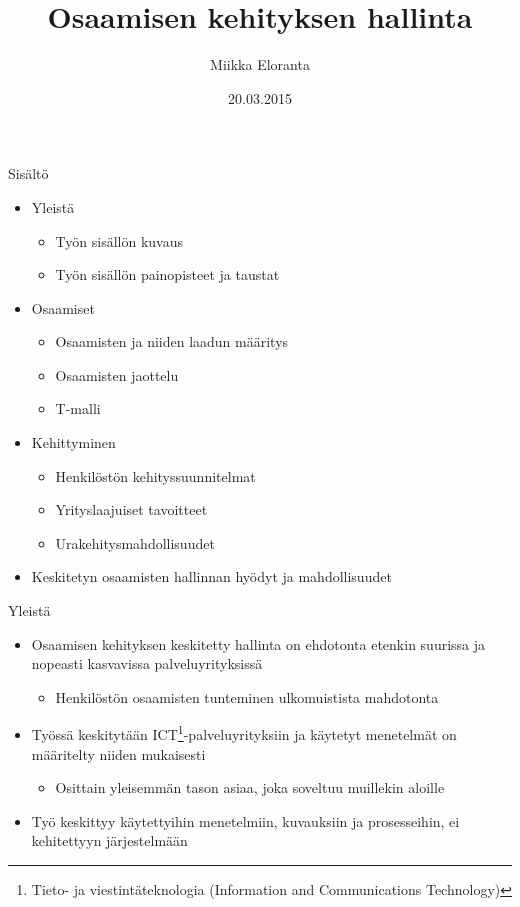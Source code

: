 \documentclass[first=purple,second=dblue,logo=redquo]{aaltoslides}
\title{Osaamisen kehityksen hallinta}
\author[M. Eloranta]{Miikka Eloranta}
\institute[AS]{Automaatio- ja systeemitekniikka\\
Sähkötekniikan korkeakoulu, Aalto-yliopisto}
\date{20.03.2015}
\begin{document}
\aaltotitleframe

\begin{frame}{Sisältö}
\begin{itemize}
\item Yleistä
\begin{itemize}
\item Työn sisällön kuvaus
\item Työn sisällön painopisteet ja taustat
\end{itemize}
\item Osaamiset
\begin{itemize}
\item Osaamisten ja niiden laadun määritys
\item Osaamisten jaottelu
\item T-malli
\end{itemize}
\item Kehittyminen
\begin{itemize}
\item Henkilöstön kehityssuunnitelmat
\item Yrityslaajuiset tavoitteet
\item Urakehitysmahdollisuudet
\end{itemize}
\item Keskitetyn osaamisten hallinnan hyödyt ja mahdollisuudet
\end{itemize}
\end{frame}

\begin{frame}{Yleistä}
\begin{itemize}
\item Osaamisen kehityksen keskitetty hallinta on ehdotonta etenkin suurissa ja nopeasti kasvavissa palveluyrityksissä
\begin{itemize}
\item Henkilöstön osaamisten tunteminen ulkomuistista mahdotonta
\end{itemize}
\item Työssä keskitytään ICT\footnote{\tiny{Tieto- ja viestintäteknologia (Information and Communications Technology)}}-palveluyrityksiin ja käytetyt menetelmät on määritelty niiden mukaisesti
\begin{itemize}
\item Osittain yleisemmän tason asiaa, joka soveltuu muillekin aloille
\end{itemize}
\item Työ keskittyy käytettyihin menetelmiin, kuvauksiin ja prosesseihin, ei kehitettyyn järjestelmään
\end{itemize}
\end{frame}
\end{document}
